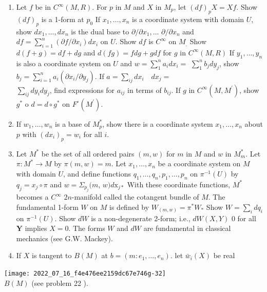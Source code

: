 \documentclass[10pt]{article}
\begin{document}
\begin{enumerate}
  \item Let $f$ be in $C^{\infty}(M, R)$. For $p$ in $M$ and $X$ in $M_{p}$, let $(d f)_{p} X=X f$. Show $(d f)_{p}$ is a 1-form at $p_{0}$ If $x_{1}, \ldots, x_{n}$ is a coordinate system with domain $U$, show $d x_{1}, \ldots, d x_{n}$ is the dual base to $\partial / \partial x_{1}, \ldots$ $\partial / \partial x_{n}$ and $d f=\sum_{i=1}^{n}\left(\partial f / \partial x_{i}\right) d x_{i}$ on $U .$ Show $d f$ is $C^{\infty}$ on $M_{.}$ Show $d(f+g)=d f+d g$ and $d(f g)=f d g+g d f$ for $g$ in $C^{\infty}(M, R)$ If $y_{1}, \ldots, y_{n}$ is also a coordinate system on $U$ and $w=\sum_{1}^{n} a_{i} d x_{i}=$ $\sum_{1}^{n} b_{j} d y_{j}$, show $b_{j}=\sum_{i=1}^{n} a_{i}\left(\partial x_{i} / \partial y_{j}\right)$. If $a=\sum_{i j} d x_{i} \quad d x_{j}=$\\
$\sum_{i j} d y_{i} d y_{j}$, find expressions for $a_{i j}$ in terms of $b_{i j}$. If $g$ in $C^{\infty}\left(M, M^{\prime}\right)$, show $g^{*}$ o $d=d \circ g^{*}$ on $F^{\circ}\left(M^{\prime}\right)$.

  \item If $w_{1}, \ldots, w_{n}$ is a base of $M_{p}^{*}$, show there is a coordinate system $x_{1}, \ldots, x_{n}$ about $p$ with $\left(d x_{i}\right)_{p}=w_{i}$ for all $i$.

  \item Let $M^{*}$ be the set of all ordered pairs $(m, w)$ for $m$ in $M$ and $w$ in $M_{m}^{*}$. Let $\pi: M^{*} \rightarrow M$ by $\pi(m, w)=m$. Let $x_{1}, \ldots, x_{n}$ be a coordinate system on $M$ with domain $U$, and define functions $q_{1}, \ldots, q_{n}, p_{1}, \ldots, p_{n}$ on $\pi^{-1}(U)$ by $q_{j}=x_{j} \circ \pi$ and $w=\Sigma_{p_{j}}(m$, $w) d \mathrm{x}_{j *}$ With these coordinate functions, $M^{*}$ becomes a $C^{\infty}$ $2 n$-manifold called the cotangent bundle of $M$. The fundamental 1-form $W$ on $M$ is defined by $W_{(m, w)}=\pi^{*} W_{*}$ Show $W=\sum_{i} d q_{i}$ on $\pi^{-1}(U)$. Show $d W$ is a non-degenerate 2-form; i.e., $d W(X, Y)$ 0 for all $\boldsymbol{Y}$ implies $X=0$. The forms $W$ and $d W$ are fundamental in classical mechanics (see G.W. Mackey).

  \item If $X$ is tangent to $B(M)$ at $b=\left(m: e_{1}, \ldots, e_{n}\right) .$ let $\bar{w}_{i}(X)$ be real

\end{enumerate}
\texttt{[image: 2022\_07\_16\_f4e476ee2159dc67e746g-32]}\\
$B(M)$ (see problem 22 ).
\end{document}
